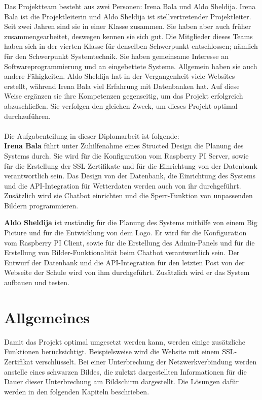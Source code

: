 Das Projektteam besteht aus zwei Personen: Irena Bala und Aldo Sheldija. Irena Bala ist die Projektleiterin und Aldo Sheldija ist stellvertretender Projektleiter. Seit zwei Jahren sind sie in einer Klasse zusammen. Sie haben aber auch fr\"{u}her zusammengearbeitet, deswegen kennen sie sich gut. Die Mitglieder dieses Teams haben sich in der vierten Klasse f\"{u}r denselben Schwerpunkt entschlossen; n\"{a}mlich f\"{u}r den Schwerpunkt Systemtechnik. Sie haben gemeinsame Interesse an Softwareprogrammierung und an eingebettete Systeme. Allgemein haben sie auch andere F\"{a}higkeiten. Aldo Sheldija hat in der Vergangenheit viele Websites erstellt, w\"{a}hrend Irena Bala viel Erfahrung mit Datenbanken hat. Auf diese Weise erg\"{a}nzen sie ihre Kompetenzen gegenseitig, um das Projekt erfolgreich abzuschlie\ss{}en. Sie verfolgen den gleichen Zweck, um dieses Projekt optimal durchzuf\"{u}hren.
\\\\
Die Aufgabenteilung in dieser Diplomarbeit ist folgende: \\

\textbf{Irena Bala} f\"{u}hrt unter Zuhilfenahme eines Structed Design die Planung des Systems durch. Sie wird f\"{u}r die Konfiguration vom Raspberry PI Server, sowie f\"{u}r die Erstellung der SSL-Zertifikate und f\"{u}r die Einrichtung von der Datenbank verantwortlich sein. Das Design von der Datenbank, die Einrichtung des Systems und die API-Integration f\"{u}r Wetterdaten werden auch von ihr durchgef\"{u}hrt. Zus\"{a}tzlich wird sie Chatbot einrichten und die Sperr-Funktion von unpassenden Bildern programmieren. 

\textbf{Aldo Sheldija} ist zust\"{a}ndig f\"{u}r die Planung des Systems mithilfe von einem Big Picture und f\"{u}r die Entwicklung von dem Logo. Er wird f\"{u}r die Konfiguration vom Raspberry PI Client, sowie f\"{u}r die Erstellung des Admin-Panels und f\"{u}r die Erstellung von Bilder-Funktionalit\"{a}t beim Chatbot verantwortlich sein. Der Entwurf der Datenbank und die API-Integration f\"{u}r den letzten Post von der Webseite der Schule wird von ihm durchgef\"{u}hrt. Zus\"{a}tzlich wird er das System aufbauen und testen.

\section{Allgemeines}

Damit das Projekt optimal umgesetzt werden kann, werden einige zus\"{a}tzliche Funktionen ber\"{u}cksichtigt. Beispielsweise wird die Website mit einem SSL-Zertifikat verschl\"{u}sselt. Bei einer Unterbrechung der Netzwerkverbindung werden anstelle eines schwarzen Bildes, die zuletzt dargestellten Informationen f\"{u}r die Dauer dieser Unterbrechung am Bildschirm dargestellt. Die L\"{o}sungen daf\"{u}r werden in den folgenden Kapiteln beschrieben. 



